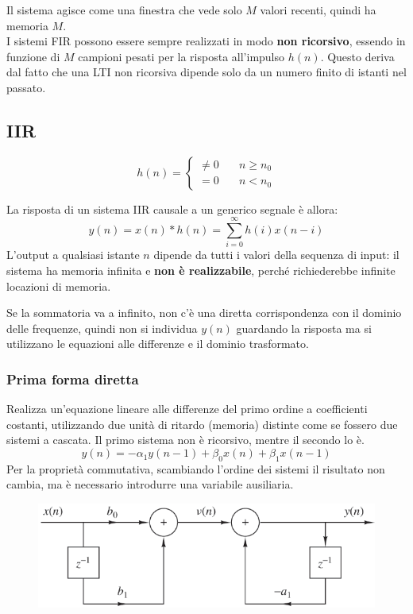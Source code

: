 Il sistema agisce come una finestra che vede solo $M$ valori recenti, quindi ha memoria $M$. \\
I sistemi FIR possono essere sempre realizzati in modo \textbf{non ricorsivo}, essendo in funzione di $M$ campioni pesati per la risposta all'impulso $h(n)$. Questo deriva dal fatto che una LTI non ricorsiva dipende solo da un numero finito di istanti nel passato.

\subsection{IIR}
$$h(n) = \begin{cases}
\neq 0 & \quad n \geq n_0 \\
= 0 & \quad n < n_0
\end{cases}$$

La risposta di un sistema IIR causale a un generico segnale è allora:
$$y(n) = x(n) * h(n) = \sum_{i = 0}^{\infty} h(i)x(n - i)$$
L'output a qualsiasi istante $n$ dipende da tutti i valori della sequenza di input: il sistema ha memoria infinita e \textbf{non è realizzabile}, perché richiederebbe infinite locazioni di memoria. 

Se la sommatoria va a infinito, non c'è una diretta corrispondenza con il dominio delle frequenze, quindi non si individua $y(n)$ guardando la risposta ma si utilizzano le equazioni alle differenze e il dominio trasformato.

\subsubsection{Prima forma diretta}
Realizza un'equazione lineare alle differenze del primo ordine a coefficienti costanti, utilizzando due unità di ritardo (memoria) distinte come se fossero due sistemi a cascata. Il primo sistema non è ricorsivo, mentre il secondo lo è.
$$y(n) = -\alpha_1y(n-1) + \beta_0x(n) + \beta_1x(n-1)$$
Per la proprietà commutativa, scambiando l'ordine dei sistemi il risultato non cambia, ma è necessario introdurre una variabile ausiliaria.
\begin{figure}[h]
	\centering
	\includegraphics[scale=0.4]{Lezioni/Immagini/diretta1}
\end{figure}

